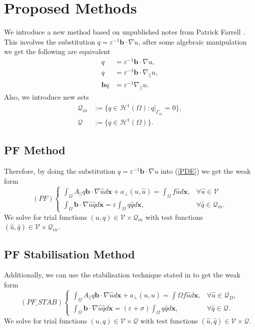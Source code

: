 \documentclass[12pt]{ociamthesis}
\begin{document}
\section{Proposed Methods}
We introduce a new method based on unpublished notes from Patrick Farrell \cite{}. This involves the substitution $q=\varepsilon^{-1} \mathbf{b} \cdot \nabla u$, after some algebraic manipulation we get the following are equivalent
\begin{align}
q &= \varepsilon^{-1} \mathbf{b}\cdot \nabla u,\\
q &= \varepsilon^{-1} \mathbf{b} \cdot \nabla_{||} u, \\
\mathbf{b}q &= \varepsilon^{-1} \nabla_{||} u.
\end{align}
Also, we introduce new sets 
\begin{align}
\mathcal{Q}_{in} &:= \{ q \in \mathcal{H}^1(\Omega) : q|_{\Gamma_{in}}=0\}, \\
\mathcal{Q} &:= \{ q \in \mathcal{H}^1(\Omega)\}.
\end{align}

\subsection{PF Method}
Therefore, by doing the substitution $q=\varepsilon^{-1} \mathbf{b} \cdot \nabla u$ into (\ref{PDE}) we get the weak form
\begin{equation} \label{PF_w}
(PF)
\begin{cases}
\int_{\Omega}A_{||}q\mathbf{b} \cdot \nabla \hat{u}  d\mathbf{x} + a_{\perp}(u, \hat{u}) 
= \int_{\Omega} f \hat{u} d\mathbf{x},
&\forall \hat{u} \in \mathcal{V}\\
\int_{\Omega}\mathbf{b} \cdot \nabla \hat{u}\hat{q} d\mathbf{x} 
= \varepsilon \int_{\Omega}q\hat{q} d \mathbf{x}, 
&\forall \hat{q} \in \mathcal{Q}_{in}.
\end{cases}
\end{equation}
We solve for trial functions $(u,q) \in \mathcal{V} \times \mathcal{Q}_{in}$ with test functions $(\hat{u}, \hat{q}) \in \mathcal{V} \times \mathcal{Q}_{in}$. 


\subsection{PF Stabilisation Method}
Additionally, we can use the stabilisation technique stated in \cite{STAB} to get the weak form
\begin{equation} \label{PF_STAB_w}
(PF\_STAB)
\begin{cases}
\int_{\Omega}A_{||}q\mathbf{b} \cdot \nabla \hat{u}  d\mathbf{x} + a_{\perp}(u, \hat{u}) 
= \int{\Omega} f \hat{u} d\mathbf{x},
&\forall \hat{u} \in \mathcal{Q}_D,\\
\int_{\Omega}\mathbf{b} \cdot \nabla \hat{u}\hat{q} d\mathbf{x} 
= (\varepsilon + \sigma)\int_{\Omega}q\hat{q} d \mathbf{x}, 
&\forall \hat{q} \in \mathcal{Q}.
\end{cases}
\end{equation}
We solve for trial functions $(u,q) \in \mathcal{V} \times \mathcal{Q}$ with test functions $(\hat{u}, \hat{q}) \in \mathcal{V} \times \mathcal{Q}$. 
\end{document}
